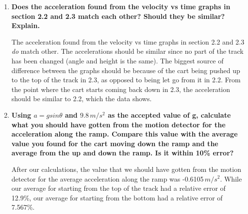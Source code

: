 \begin{enumerate}
\item \textbf{Does the acceleration found from the velocity vs time graphs in section 2.2 and 2.3 match each other? Should they be similar? Explain.}

	The acceleration found from the velocity vs time graphs in section 2.2 and 2.3 \textit{do} match other. The accelerations should be similar since no part of the track has been changed (angle and height is the same). The biggest source of difference between the graphs should be because of the cart being pushed up to the top of the track in 2.3, as opposed to being let go from it in 2.2. From the point where the cart starts coming back down in 2.3, the acceleration should be similar to 2.2, which the data shows. 

\item \textbf{Using $a=gsin\theta$ and $9.8\,m/s^2$ as the accepted value of g, calculate what you should have gotten from the motion detector for the acceleration along the ramp. Compare this value with the average value you found for the cart moving down the ramp and the average from the up and down the ramp. Is it within 10\% error?}

	After our calculations, the value that we should have gotten from the motion detector for the average acceleration along the ramp was -0.6105\,$m/s^2$. While our average for starting from the top of the track had a relative error of 12.9\%, our average for starting from the bottom had a relative error of 7.567\%. 
	
\end{enumerate}

